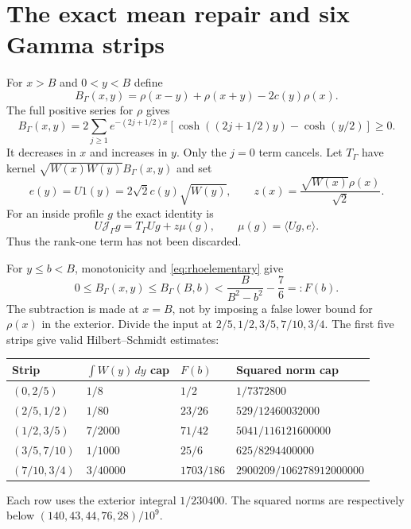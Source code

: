 \documentclass[11pt,a4paper]{article}
\numberwithin{equation}{section}
\theoremstyle{remark}\newtheorem{remark}[theorem]{Remark}
\newcommand{\ip}[2]{\langle#1,#2\rangle}\newcommand{\dd}{\mathop{}\!\mathrm d}
\begin{document}
\section{The exact mean repair and six Gamma strips}\label{sec:meanrepair}
For $x>B$ and $0<y<B$ define
\begin{equation}\label{eq:remainderkernel}
 B_\Gamma(x,y)=\rho(x-y)+\rho(x+y)-2c(y)\rho(x).
\end{equation}
The full positive series for $\rho$ gives
\[
 B_\Gamma(x,y)=2\sum_{j\ge1}e^{-(2j+1/2)x}
 [\cosh((2j+1/2)y)-\cosh(y/2)]\ge0.
\]
It decreases in $x$ and increases in $y$. Only the $j=0$ term cancels.
Let $T_\Gamma$ have kernel $\sqrt{W(x)W(y)}B_\Gamma(x,y)$ and set
\[
 e(y)=U1(y)=2\sqrt2c(y)\sqrt{W(y)},\qquad
 z(x)=\frac{\sqrt{W(x)}\rho(x)}{\sqrt2}.
\]
For an inside profile $g$ the exact identity is
\begin{equation}\label{eq:rankrepair}
 U\mathcal J_\Gamma g=T_\Gamma Ug+z\mu(g),\qquad
 \mu(g)=\ip{Ug}{e}.
\end{equation}
Thus the rank-one term has not been discarded.

For $y\le b<B$, monotonicity and \eqref{eq:rhoelementary} give
\[
 0\le B_\Gamma(x,y)\le B_\Gamma(B,b)
 <\frac{B}{B^2-b^2}-\frac76=:F(b).
\]
The subtraction is made at $x=B$, not by imposing a false lower bound for $\rho(x)$ in the exterior.
Divide the input at $2/5,1/2,3/5,7/10,3/4$.
The first five strips give valid Hilbert--Schmidt estimates:
\begin{center}\small
\begin{tabular}{@{}llll@{}}\toprule
Strip & $\int W(y)\,dy$ cap & $F(b)$ & Squared norm cap\\\midrule
$(0,2/5)$ & $1/8$ & $1/2$ & $1/7372800$\\
$(2/5,1/2)$ & $1/80$ & $23/26$ & $529/12460032000$\\
$(1/2,3/5)$ & $7/2000$ & $71/42$ & $5041/116121600000$\\
$(3/5,7/10)$ & $1/1000$ & $25/6$ & $625/8294400000$\\
$(7/10,3/4)$ & $3/40000$ & $1703/186$ & $2900209/106278912000000$\\\bottomrule
\end{tabular}
\end{center}
Each row uses the exterior integral $1/230400$.
The squared norms are respectively below $(140,43,44,76,28)/10^9$.
\end{document}

